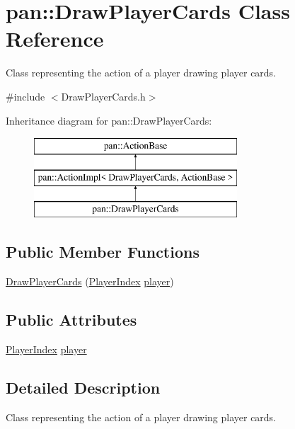 \hypertarget{classpan_1_1_draw_player_cards}{}\section{pan\+:\+:Draw\+Player\+Cards Class Reference}
\label{classpan_1_1_draw_player_cards}


Class representing the action of a player drawing player cards.  




{\ttfamily \#include $<$Draw\+Player\+Cards.\+h$>$}

Inheritance diagram for pan\+:\+:Draw\+Player\+Cards\+:\begin{figure}[H]
\begin{center}
\leavevmode
\includegraphics[height=3.000000cm]{classpan_1_1_draw_player_cards}
\end{center}
\end{figure}
\subsection*{Public Member Functions}
\begin{DoxyCompactItemize}
\item 
\hyperlink{classpan_1_1_draw_player_cards_ad76432d661eb15b69cc3236fd8f4f896}{Draw\+Player\+Cards} (\hyperlink{namespacepan_a0cdabf874fbf1bb3a1f0152d108c2909}{Player\+Index} \hyperlink{classpan_1_1_draw_player_cards_a62969ce5dc8a1eeaa104acd073d3971b}{player})
\end{DoxyCompactItemize}
\subsection*{Public Attributes}
\begin{DoxyCompactItemize}
\item 
\hyperlink{namespacepan_a0cdabf874fbf1bb3a1f0152d108c2909}{Player\+Index} \hyperlink{classpan_1_1_draw_player_cards_a62969ce5dc8a1eeaa104acd073d3971b}{player}
\end{DoxyCompactItemize}


\subsection{Detailed Description}
Class representing the action of a player drawing player cards. 

